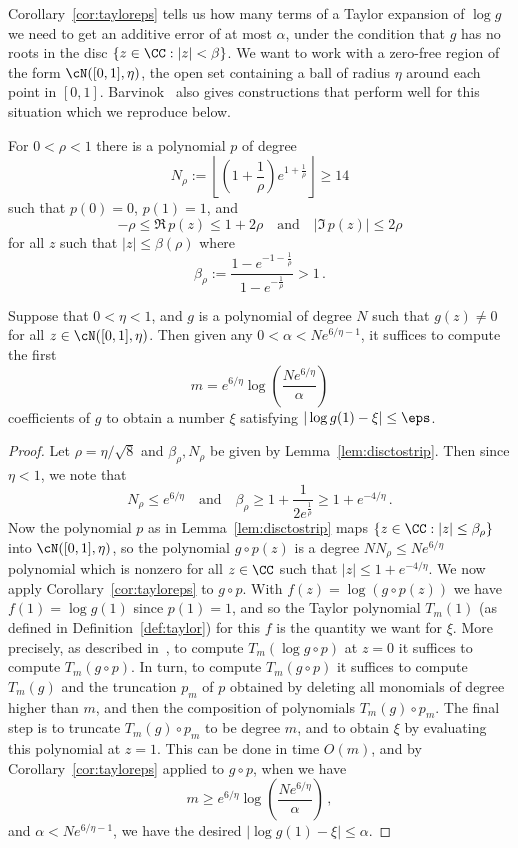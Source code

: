 %
Corollary~\ref{cor:tayloreps} tells us how many terms of a Taylor expansion of $\log g$ we need to get an additive error of at most $\alpha$, under the condition that $g$ has no roots in the disc $\{z\in\CC : |z|<\beta\}$. 
We want to work with a zero-free region of the form $\cN([0,1],\eta)$, the open set containing a ball of radius $\eta$ around each point in $[0,1]$. 
Barvinok~\cite{Barvinok16,Barvinok18} also gives constructions that perform well for this situation which we reproduce below.
%
\begin{lemma}\label{lem:disctostrip}
For $0<\rho<1$ there is a polynomial $p$ of degree
\[
N_\rho := \left\lfloor\left(1+\frac{1}{\rho}\right)e^{1+\frac{1}{\rho}}\right\rfloor \ge 14
\]
such that $p(0)=0$, $p(1)=1$, and 
\[
-\rho \le \Re\, p(z) \le 1 + 2\rho 
\quad\text{and}\quad
|\Im\, p(z)| \le 2\rho
\]
for all $z$ such that $|z|\le \beta(\rho)$ where
\[
\beta_\rho := \frac{1-e^{-1-\frac{1}{\rho}}}{1-e^{-\frac{1}{\rho}}} > 1\,.
\]
\end{lemma}
%
\begin{corollary}\label{cor:stripaccuracy}
Suppose that $0<\eta<1$, and $g$ is a polynomial of degree $N$ such that $g(z)\ne0$ for all $z\in\cN([0,1],\eta)$. 
Then given any $0<\alpha<Ne^{6/\eta-1}$, it suffices to compute the first
\[
m=e^{6/\eta}\log\left(\frac{Ne^{6/\eta}}{\alpha}\right)
\]
coefficients of $g$ to obtain a number $\xi$ satisfying $|\log g(1)-\xi| \le \eps$. 
\end{corollary}
\begin{proof}
Let $\rho=\eta/\sqrt 8$ and $\beta_\rho,N_\rho$ be given by Lemma~\ref{lem:disctostrip}. 
Then since $\eta<1$, we note that
\[
N_\rho\le e^{6/\eta}
\quad\text{and}\quad
\beta_\rho \ge 1 + \frac{1}{2e^{\frac{1}{\rho}}} \ge 1+ e^{-4/\eta}\,.
\]
Now the polynomial $p$ as in Lemma~\ref{lem:disctostrip} maps $\{z\in\CC : |z|\le \beta_\rho\}$ into $\cN([0,1], \eta)$, so the polynomial $g\circ p(z)$ is a degree $NN_\rho \le Ne^{6/\eta}$
polynomial which is nonzero for all $z\in\CC$ such that $|z|\le 1+ e^{-4/\eta}$.
%
We now apply Corollary~\ref{cor:tayloreps} to $g\circ p$. 
With $f(z) = \log(g\circ p(z))$ we have $f(1) = \log g(1)$ since $p(1)=1$, and so the Taylor polynomial $T_m(1)$ (as defined in Definition~\ref{def:taylor}) for this $f$ is the quantity we want for $\xi$.
More precisely, as described in~\cite[Section 2.2.2]{Barvinok16}, to compute $T_m(\log g\circ p)$ at $z=0$ it suffices to compute $T_m(g\circ p)$. 
In turn, to compute $T_m(g\circ p)$ it suffices to compute $T_m(g)$ and the truncation $p_m$ of $p$ obtained by deleting all monomials of degree higher than $m$, and then the composition of polynomials $T_m(g) \circ p_m$.
The final step is to truncate $T_m(g) \circ p_m$ to be degree $m$, and to obtain $\xi$ by evaluating this polynomial at $z=1$.
This can be done in time $O(m)$, and by Corollary~\ref{cor:tayloreps} applied to $g\circ p$, when we have
\[
m \ge e^{6/\eta}\log\left(\frac{Ne^{6/\eta}}{\alpha}\right)\,,
\]
and $\alpha < Ne^{6/\eta-1}$, we have the desired $|\log g(1) - \xi| \le\alpha$.
\end{proof}
